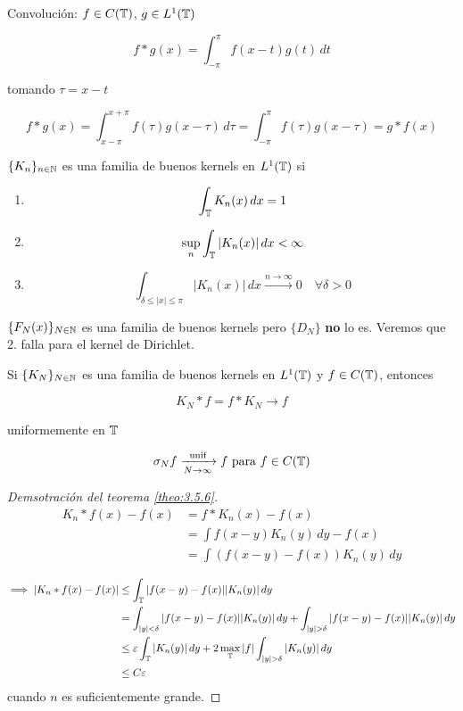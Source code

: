 Convolución: $f\in C(\mathbb{T})$, $g\in L^1(\mathbb{T})$

\[f*g(x)=\int_{-\pi}^\pi f(x-t)g(t)\,dt\]

tomando $\tau=x-t$

\[f*g(x)=\int_{x-\pi}^{x+\pi} f(\tau)g(x-\tau)\,d\tau=\int_{-\pi}^\pi f(\tau) g(x-\tau)=g*f(x)\]

\begin{fdefinition}
    $\{K_n\}_{n\in\mathbb{N}}$ es una familia de buenos kernels en $L^1(\mathbb{T})$ si

    \begin{enumerate}
        \item \[\int_{\mathbb{T}} K_n(x)\,dx=1\]
        \item \[\sup_n \int_{\mathbb{T}} |K_n(x)|\,dx<\infty\]
        \item \[\int_{\delta\leq |x|\leq \pi} |K_n(x)|\,dx \xrightarrow{n\to\infty} 0\quad \forall \delta >0\]
    \end{enumerate}
\end{fdefinition}

\begin{fnote}
    $\{F_N(x)\}_{N\in\mathbb{N}}$ es una familia de buenos kernels pero $\{D_N\}$ \textbf{no} lo es. Veremos que 2. falla para el kernel de Dirichlet.
\end{fnote}

\begin{ftheorem}
    Si $\{K_N\}_{N\in\mathbb{N}}$ es una familia de buenos kernels en $L^1(\mathbb{T})$ y $f\in C(\mathbb{T})$, entonces 

    \[K_N*f=f*K_N\to f\]

    uniformemente en $\mathbb{T}$
\end{ftheorem}

\begin{fcorollary}
    \[\sigma_N f\xrightarrow[N\to\infty]{\text{unif}} f\text{ para }f\in C(\mathbb{T})\]

\end{fcorollary}

\begin{proof}[Demsotración del teorema \ref{theo:3.5.6}]
    \begin{align*}
        K_n*f(x)-f(x)&=f*K_n(x)-f(x)\\
        &=\int f(x-y)K_n(y)\,dy-f(x)\\
        &=\int (f(x-y)-f(x))K_n(y)\,dy
    \end{align*}

    \begin{align*}
        \implies |K_n*f(x)-f(x)|&\leq \int_\T |f(x-y)-f(x)||K_n(y)|\,dy\\
        &=\int_{|y|<\delta} |f(x-y)-f(x)||K_n(y)|\,dy+\int_{|y|>\delta} |f(x-y)-f(x)||K_n(y)|\,dy\\
        &\leq \varepsilon\int_\mathbb{T} |K_n(y)|\,dy+2\max_\T |f|\int_{|y|>\delta}|K_n(y)|\,dy\\
        &\leq C\varepsilon
    \end{align*}
    cuando $n$ es suficientemente grande.
\end{proof}

